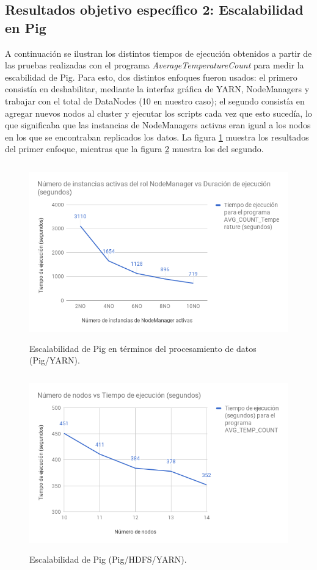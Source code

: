 \subsection{Resultados objetivo específico 2: Escalabilidad en Pig}

A continuación se ilustran los distintos tiempos de ejecución obtenidos a partir de las pruebas realizadas con el programa \textit{AverageTemperatureCount} para medir la escabilidad de Pig. Para esto, dos distintos enfoques fueron usados: el primero consistía en deshabilitar, mediante la interfaz gráfica de YARN, NodeManagers y trabajar con el total de DataNodes (10 en nuestro caso); el segundo consistía en agregar nuevos nodos al cluster y ejecutar los scripts cada vez que esto sucedía, lo que significaba que las instancias de NodeManagers activas eran igual a los nodos en los que se encontraban replicados los datos. La figura \ref{07_02_01} muestra los resultados del primer enfoque, mientras que la figura \ref{07_02_02} muestra los del segundo.

\begin{figure}[H]
  \centering
      \includegraphics[width=\textwidth, height=3.0in]{fig/07/02_01}
  \caption{Escalabilidad de Pig en términos del procesamiento de datos (Pig/YARN).}
  \label{07_02_01}
\end{figure}

\begin{figure}[H]
  \centering
      \includegraphics[width=\textwidth, height=3.0in]{fig/07/02_02}
  \caption{Escalabilidad de Pig (Pig/HDFS/YARN).}
  \label{07_02_02}
\end{figure}

